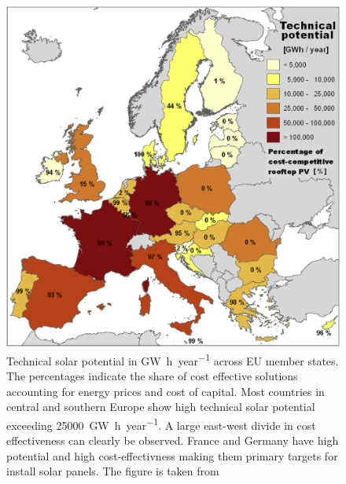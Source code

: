 \documentclass{article} %
\begin{document}
\begin{figure}
	\centering
	\caption{Technical solar potential in \si{\giga\watt\hour\per year} across EU member states. The percentages indicate the share of cost effective solutions accounting for energy prices and cost of capital. Most countries in central and southern Europe show high technical solar potential exceeding \SI{25000}{\giga\watt\hour\per year}. A large east-west divide in cost effectiveness can clearly be observed. France and Germany have high potential and high cost-effectivness making them primary targets for install solar panels. The figure is taken from \citet{bodis2019high}}
	\includegraphics[width=0.7\linewidth]{../figures/technical_potential_eu.jpg}
\end{figure}
\end{document}
